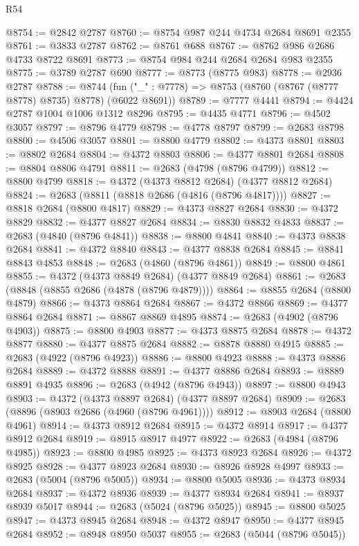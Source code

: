 \begin{lexlean}{R54}
\begin{coremodule}
@8754 := @2842 @2787
@8760 := @8754 @987 @244 @4734 @2684 @8691 @2355
@8761 := @3833 @2787
@8762 := @8761 @688
@8767 := @8762 @986 @2686 @4733 @8722 @8691
@8773 := @8754 @984 @244 @2684 @2684 @983 @2355
@8775 := @3789 @2787 @690
@8777 := @8773 (@8775 @983)
@8778 := @2936 @2787
@8788 := @8744 (fun ("_" : @7778) => @8753 (@8760 (@8767 (@8777 @8778) @8735) @8778) (@6022 @8691))
@8789 := @7777 @4441
@8794 := @4424 @2787 @1004 @1006 @1312 @8296
@8795 := @4435 @4771
@8796 := @4502 @3057
@8797 := @8796 @4779
@8798 := @4778 @8797
@8799 := @2683 @8798
@8800 := @4506 @3057
@8801 := @8800 @4779
@8802 := @4373 @8801
@8803 := @8802 @2684
@8804 := @4372 @8803
@8806 := @4377 @8801 @2684
@8808 := @8804 @8806 @4791
@8811 := @2683 (@4798 (@8796 @4799))
@8812 := @8800 @4799
@8818 := @4372 (@4373 @8812 @2684) (@4377 @8812 @2684)
@8824 := @2683 (@8811 (@8818 @2686 (@4816 (@8796 @4817))))
@8827 := @8818 @2684 (@8800 @4817)
@8829 := @4373 @8827 @2684
@8830 := @4372 @8829
@8832 := @4377 @8827 @2684
@8834 := @8830 @8832 @4833
@8837 := @2683 (@4840 (@8796 @4841))
@8838 := @8800 @4841
@8840 := @4373 @8838 @2684
@8841 := @4372 @8840
@8843 := @4377 @8838 @2684
@8845 := @8841 @8843 @4853
@8848 := @2683 (@4860 (@8796 @4861))
@8849 := @8800 @4861
@8855 := @4372 (@4373 @8849 @2684) (@4377 @8849 @2684)
@8861 := @2683 (@8848 (@8855 @2686 (@4878 (@8796 @4879))))
@8864 := @8855 @2684 (@8800 @4879)
@8866 := @4373 @8864 @2684
@8867 := @4372 @8866
@8869 := @4377 @8864 @2684
@8871 := @8867 @8869 @4895
@8874 := @2683 (@4902 (@8796 @4903))
@8875 := @8800 @4903
@8877 := @4373 @8875 @2684
@8878 := @4372 @8877
@8880 := @4377 @8875 @2684
@8882 := @8878 @8880 @4915
@8885 := @2683 (@4922 (@8796 @4923))
@8886 := @8800 @4923
@8888 := @4373 @8886 @2684
@8889 := @4372 @8888
@8891 := @4377 @8886 @2684
@8893 := @8889 @8891 @4935
@8896 := @2683 (@4942 (@8796 @4943))
@8897 := @8800 @4943
@8903 := @4372 (@4373 @8897 @2684) (@4377 @8897 @2684)
@8909 := @2683 (@8896 (@8903 @2686 (@4960 (@8796 @4961))))
@8912 := @8903 @2684 (@8800 @4961)
@8914 := @4373 @8912 @2684
@8915 := @4372 @8914
@8917 := @4377 @8912 @2684
@8919 := @8915 @8917 @4977
@8922 := @2683 (@4984 (@8796 @4985))
@8923 := @8800 @4985
@8925 := @4373 @8923 @2684
@8926 := @4372 @8925
@8928 := @4377 @8923 @2684
@8930 := @8926 @8928 @4997
@8933 := @2683 (@5004 (@8796 @5005))
@8934 := @8800 @5005
@8936 := @4373 @8934 @2684
@8937 := @4372 @8936
@8939 := @4377 @8934 @2684
@8941 := @8937 @8939 @5017
@8944 := @2683 (@5024 (@8796 @5025))
@8945 := @8800 @5025
@8947 := @4373 @8945 @2684
@8948 := @4372 @8947
@8950 := @4377 @8945 @2684
@8952 := @8948 @8950 @5037
@8955 := @2683 (@5044 (@8796 @5045))

\end{coremodule}
\end{lexlean}
